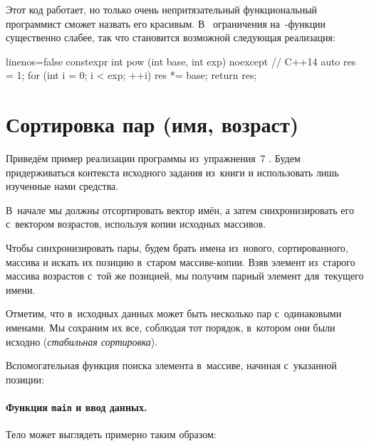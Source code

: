 Этот код работает, но только очень непритязательный функциональный программист сможет назвать его красивым. В~ ограничения на~-функции существенно слабее, так что становится возможной следующая реализация:

\begin{cppcode*}{linenos=false}
constexpr int pow (int base, int exp) noexcept  // C++14
{
  auto res = 1;
  for (int i = 0; i < exp; ++i)
    res *= base;
  return res;
}
\end{cppcode*}



\section{Сортировка пар (имя, возраст)}
Приведём пример реализации программы из~упражнения~7 . Будем придерживаться контекста исходного задания из~книги и использовать лишь изученные нами средства.

В~начале мы должны отсортировать вектор имён, а затем синхронизировать его с~вектором возрастов, используя копии исходных массивов.


Чтобы синхронизировать пары, будем брать имена из~нового, сортированного, массива и искать их позицию в~старом массиве-копии. Взяв элемент из~старого массива возрастов с~той же позицией, мы получим парный элемент для~текущего имени.


\noindent Отметим, что в~исходных данных может быть несколько пар с~одинаковыми именами. Мы сохраним их все, соблюдая тот порядок, в~котором они были исходно (\emph{стабильная сортировка}).

Вспомогательная функция поиска элемента в~массиве, начиная с~указанной позиции:




\paragraph{Функция \texttt{main} и ввод данных.}
Тело  может выглядеть примерно таким образом:

